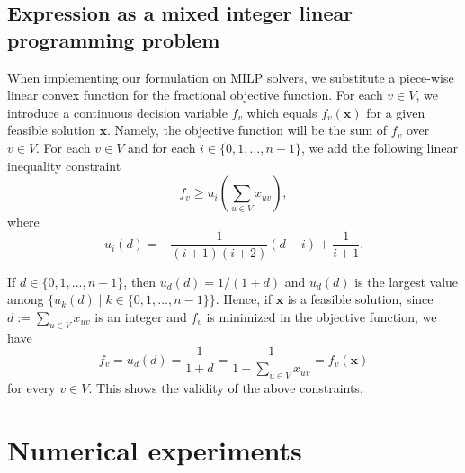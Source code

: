 \documentclass[11pt,a4paper]{article}
\newcommand{\bfx}{\boldsymbol{x}}
\newcommand{\ds}{\displaystyle}
\begin{document}
\subsection{Expression as a mixed integer linear programming problem}

When implementing our formulation on MILP solvers, 
we substitute a piece-wise linear convex function for 
the fractional objective function. 
For each $v \in V$, 
we introduce a continuous decision variable $f_v$ which equals $f_v(\bfx)$ for a given feasible solution $\bfx$. 
Namely, the objective function will be the sum of $f_v$ over $v \in V$. 
For each $v \in V$ and for each $i \in \{0,1, \ldots, n-1 \}$, 
we add the following linear inequality constraint 
\begin{equation*}\label{f_v}
f_v \ge u_i\left(\sum_{u \in V} x_{uv} \right), 
\end{equation*}
where 
\begin{equation*}
u_i(d) = -\frac{1}{(i+1)(i+2)}(d-i) + \frac{1}{i+1}. 
\end{equation*}

If $d \in \{0,1, \ldots, n-1 \}$, then 
$u_d(d) = 1 / (1+d)$ and $u_d(d)$ is the largest value among $\{ u_k(d) \mid k \in \{0,1, \ldots, n-1 \} \}$. 
Hence, if $\bfx$ is a feasible solution, since $d := \sum_{u \in V} x_{uv}$ is an integer 
and $f_v$ is minimized in the objective function, we have 
\begin{equation*}
f_v = u_d(d) = \frac{1}{1+d} = \frac{1}{\ds 1+\sum_{u \in V} x_{uv}} = f_v(\bfx) 
\end{equation*}
for every $v \in V$. 
This shows the validity of the above constraints. 

\section{Numerical experiments}\label{sec:CompRes}
\end{document}
